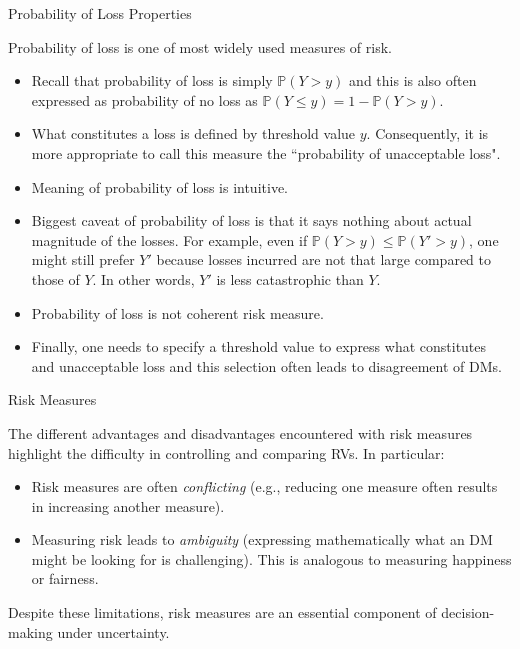 \documentclass[9pt]{beamer}
\begin{document}
%
\begin{frame}{Probability of Loss Properties}


Probability of loss is one of most widely used measures of risk.  

\begin{itemize}

\item Recall that probability of loss is simply $\mathbb{P}(Y>y)$ and this is also often expressed as probability of no loss as $\mathbb{P}(Y\leq y)=1-\mathbb{P}(Y>y)$. 

\item What constitutes a loss is defined by threshold value $y$. Consequently, it is more appropriate to call this measure the  ``probability of unacceptable loss". 

\item Meaning of probability of loss is intuitive. 

\item Biggest caveat of probability of loss is that it says nothing about actual magnitude of the losses.  For example, even if $\mathbb{P}(Y>y)\leq \mathbb{P}(Y'>y)$, one might still prefer $Y'$ because losses incurred are not that large compared to those of $Y$.  In other words, $Y'$ is less catastrophic than $Y$. 

\item Probability of loss is not coherent risk measure. 

\item Finally, one needs to specify a threshold value to express what constitutes and unacceptable loss and this selection often leads to disagreement of DMs.

\end{itemize}

\end{frame}


%
\begin{frame}{Risk Measures}

The different advantages and disadvantages encountered with risk measures highlight the difficulty in controlling and comparing RVs. In particular:

\begin{itemize}
\item Risk measures are often {\em conflicting} (e.g., reducing one measure often results in increasing another measure). 
\item Measuring risk leads to {\em ambiguity} (expressing mathematically what an DM might be looking for is challenging). This is analogous to measuring happiness or fairness. 
\end{itemize}
Despite these limitations, risk measures are an essential component of decision-making under uncertainty.

\end{frame}
\end{document}
